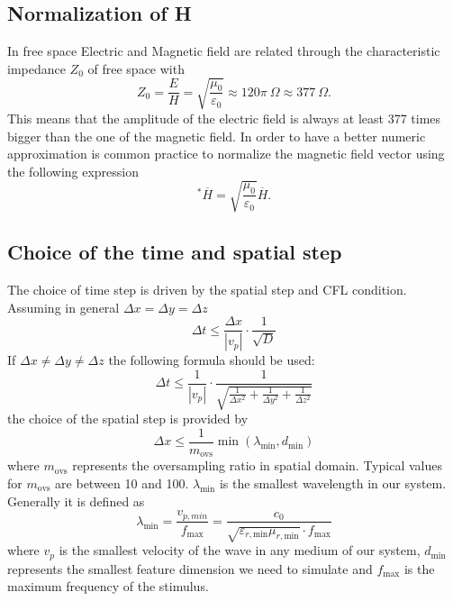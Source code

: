 \subsection{Normalization of H}
In free space Electric and Magnetic field are related through the characteristic impedance $Z_0$ of free space with
\begin{equation*}
	Z_0 = \frac{E}{H}=\sqrt{\frac{\mu_0}{\varepsilon_0}} \approx 120\pi~\Omega \approx 377~\Omega.
\end{equation*}
This means that the amplitude of the electric field is always at least 377 times bigger than the one of the magnetic field. In order to have a better numeric approximation is common practice to normalize the magnetic field vector using the following expression
\begin{equation*}
	^*\overline{H} = \sqrt{\frac{\mu_0}{\varepsilon_0}} \overline{H}.
\end{equation*}

\subsection{Choice of the time and spatial step}
\label{sec:steps}
The choice of time step is driven by the spatial step and CFL condition. Assuming in general  $\Delta x = \Delta y = \Delta z$ 
\begin{equation*}
	\Delta t \leq \frac{\Delta x}{|v_p|} \cdot \frac{1}{\sqrt{D}}
\end{equation*}
If $\Delta x \neq \Delta y \neq \Delta z$ the following formula should be used:
\begin{equation*}
	\Delta t \leq \frac{1}{|v_p|} \cdot \frac{1}{\sqrt{\frac{1}{\Delta x^2}+\frac{1}{\Delta y^2}+\frac{1}{\Delta z^2}}}
\end{equation*}
the choice of the spatial step is provided by 
\begin{equation*}
	\Delta x \leq \frac{1}{m_\textrm{ovs}} \min (\lambda_\textrm{min},d_\textrm{min})
\end{equation*}
where $m_\textrm{ovs}$ represents the oversampling ratio in spatial domain. Typical values for $m_\textrm{ovs}$ are between 10 and 100. $\lambda_\textrm{min}$ is the smallest wavelength in our system. Generally it is defined as 
\begin{equation*}
	\lambda_\textrm{min} = \frac{v_{p,min}}{f_\textrm{max}} = \frac{c_0}{\sqrt{\varepsilon_{r,\textrm{min}}\mu_{r,\textrm{min}}}\cdot f_\textrm{max} }
\end{equation*}
where $v_p$ is the smallest velocity of the wave in any medium of our system, $d_\textrm{min}$ represents the smallest feature dimension we need to simulate and $f_\textrm{max}$ is the maximum frequency of the stimulus.


